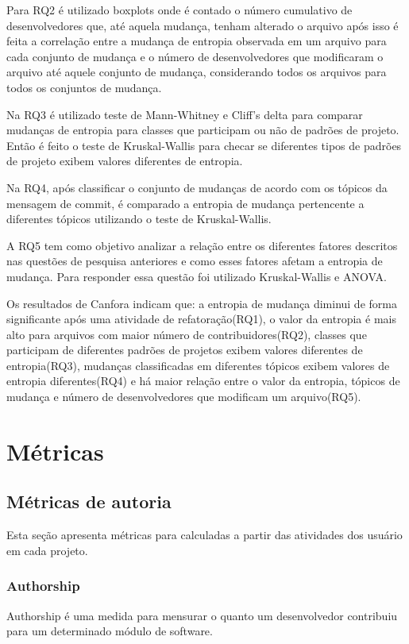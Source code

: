 Para RQ2 é utilizado boxplots onde é contado o número cumulativo de desenvolvedores que, até aquela mudança, tenham alterado o arquivo após isso é feita a correlação entre a mudança de entropia observada em um arquivo para cada conjunto de mudança e o número de desenvolvedores que modificaram o arquivo até aquele conjunto de mudança, considerando todos os arquivos para todos os conjuntos de mudança.

Na RQ3 é utilizado teste de Mann-Whitney e Cliff's delta para comparar mudanças de entropia para classes que participam ou não de padrões de projeto. Então é feito o teste de Kruskal-Wallis para checar se diferentes tipos de padrões de projeto exibem valores diferentes de entropia.

Na RQ4, após classificar o conjunto de mudanças de acordo com os tópicos da mensagem de commit, é comparado a entropia de mudança pertencente a diferentes tópicos utilizando o teste de Kruskal-Wallis.

A RQ5 tem como objetivo analizar a relação entre os diferentes fatores descritos nas questões de pesquisa anteriores e como esses fatores afetam a entropia de mudança. Para responder essa questão foi utilizado Kruskal-Wallis e ANOVA. 

Os resultados de Canfora indicam que: a entropia de mudança diminui de forma significante após uma atividade de refatoração(RQ1), o valor da entropia é mais alto para arquivos com maior número de contribuidores(RQ2), classes que participam de diferentes padrões de projetos exibem valores diferentes de entropia(RQ3), mudanças classificadas em diferentes tópicos exibem valores de entropia diferentes(RQ4) e há maior relação entre o valor da entropia, tópicos de mudança e número de desenvolvedores que modificam um arquivo(RQ5). 

\section{Métricas}
\subsection{Métricas de autoria}
Esta seção apresenta métricas para calculadas a partir das atividades dos usuário em cada projeto.

\subsubsection{Authorship}
Authorship é uma medida para mensurar o quanto um desenvolvedor contribuiu para um determinado módulo de software.

